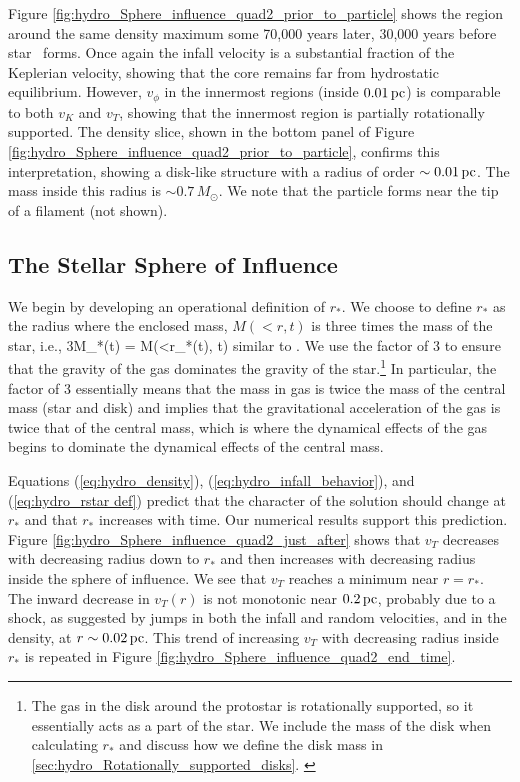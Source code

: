 \documentclass[../dissertation.tex]{subfiles}
\begin{document}
Figure \ref{fig:hydro_Sphere_influence_quad2_prior_to_particle} shows the region 
around the same density maximum some 70,000 years later, 30,000 years before 
star \partA\ forms.
Once again the infall velocity is a substantial fraction of the Keplerian velocity, 
showing that the core remains far from hydrostatic equilibrium.
However, $v_{\phi}$ in the innermost regions (inside $0.01\,\rm pc$) is 
comparable to both $v_K$ and $v_T$, showing that the innermost 
region is partially rotationally supported. The density slice, shown in the bottom 
panel of Figure \ref{fig:hydro_Sphere_influence_quad2_prior_to_particle}, confirms this  
interpretation, showing a disk-like structure with a radius of order $\sim 0.01 \,\rm pc$. 
The mass inside this radius is $\sim 0.7\,M_\odot$.
We note that the particle forms near the tip of a filament (not shown).


\subsection{The Stellar Sphere of Influence} \label{sec:hydro_r_star}
We begin by developing an operational definition of $r_*$.  We choose to define $r_*$ 
as the radius where the enclosed mass, $M(<r, t)$ is three times the mass 
of the star, i.e., 
\be
3M_*(t) = M(<r_*(t), t)
\label{eq:hydro_rstar def}
\ee
similar to \citet{2015ApJ...804...44M}. 
We use the factor of 3 to ensure that the gravity of the gas dominates the gravity 
of the star.\footnote{
The gas in the disk around the protostar is rotationally supported, so 
it essentially acts as a part of the star. We include the mass of the disk 
when calculating $r_*$ and discuss how we define the disk mass in 
\ref{sec:hydro_Rotationally_supported_disks}. \label{footnote:disk_mass}}
In particular, the factor of 3 essentially means that the mass in gas is twice the mass of the central mass (star and disk) and implies that the gravitational acceleration of the gas is twice that of the central mass, which is where the dynamical effects of the gas begins to dominate the dynamical effects of the central mass.

Equations (\ref{eq:hydro_density}), (\ref{eq:hydro_infall_behavior}), and (\ref{eq:hydro_rstar def})
predict that the 
character of the solution should change at $r_*$ and that $r_*$ 
increases with time. Our numerical results support this prediction.
Figure \ref{fig:hydro_Sphere_influence_quad2_just_after} shows that 
$v_T$ decreases with decreasing radius down to $r_*$ 
and then  increases with decreasing radius inside the sphere of influence. We see that $v_T$ reaches a minimum near $r=r_*$.  
The inward decrease in $v_T(r)$ is not monotonic near $0.2\,\rm pc$, probably due to a shock, 
as suggested by jumps in both the infall and random 
 velocities, and 
in the density, at $ r \sim 0.02 \,\rm pc$.
This trend of increasing $v_T$ with decreasing radius inside $r_*$ is repeated in Figure %
 \ref{fig:hydro_Sphere_influence_quad2_end_time}.
\end{document}
